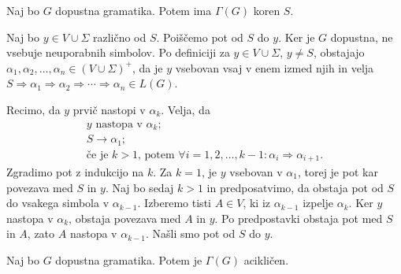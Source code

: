 \documentclass[fin1, tisk]{fmfdelo}
\theoremstyle{definition}
\begin{document}
\begin{lema}\label{lema:koren}
    Naj bo $G$ dopustna gramatika. Potem ima $\Gamma(G)$ koren $S$.
\end{lema}

\begin{dokaz}
    Naj bo $y \in V \cup \Sigma$ različno od $S$. Poiščemo pot od $S$ do $y$. Ker je $G$ dopustna,
    ne vsebuje neuporabnih simbolov. Po definiciji za $y \in V \cup \Sigma$, $ y \neq S$, obstajajo
    $\alpha_1, \alpha_2, \ldots, \alpha_n \in (V \cup \Sigma)^+$, da je $y$ vsebovan vsaj
    v enem izmed njih in velja $S \Rightarrow \alpha_1 \Rightarrow \alpha_2 \Rightarrow \cdots 
    \Rightarrow \alpha_n \in L(G)$.
    
    Recimo, da $y$ prvič nastopi v $\alpha_k$. Velja, da 
    \begin{gather*}
        y \text{ nastopa v } \alpha_k; \\
        S \rightarrow \alpha_1; \\
        \text{če je } k > 1 \text{, potem } \forall i = 1, 2, \ldots, k-1 \colon \alpha_i 
        \Rightarrow \alpha_{i+1}.
    \end{gather*}
    Zgradimo pot z indukcijo na $k$. Za $k=1$, je $y$ vsebovan v $\alpha_1$, torej je pot kar 
    povezava med $S$ in $y$. Naj bo sedaj $k>1$ in predposatvimo, da obstaja pot od $S$ do vsakega
    simbola v $\alpha_{k-1}$. Izberemo tisti $A \in V$, ki iz $\alpha_{k-1}$ izpelje $\alpha_k$.
    Ker $y$ nastopa v $\alpha_k$, obstaja povezava med $A$ in $y$. Po predpostavki obstaja pot
    med $S$ in $A$, zato $A$ nastopa v $\alpha_{k-1}$. Našli smo pot od $S$ do $y$.
\end{dokaz}

\begin{lema}\label{lema:acikličen}
    Naj bo $G$ dopustna gramatika. Potem je $\Gamma(G)$ acikličen.
\end{lema}
\end{document}
